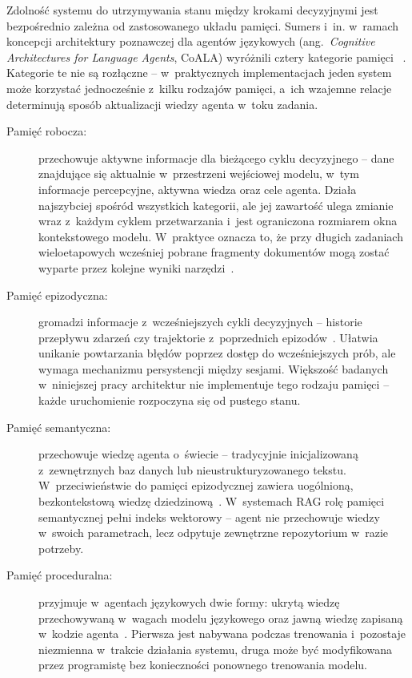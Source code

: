 Zdolność systemu do utrzymywania stanu między krokami decyzyjnymi jest
bezpośrednio zależna od zastosowanego układu pamięci. Sumers i~in. w~ramach
koncepcji architektury poznawczej dla agentów językowych
(ang.~\textit{Cognitive Architectures for Language Agents}, CoALA) wyróżnili
cztery kategorie pamięci ~\cite{sumers2023cognitive}. Kategorie te nie są
rozłączne -- w~praktycznych implementacjach jeden system może korzystać
jednocześnie z~kilku rodzajów pamięci, a~ich wzajemne relacje determinują
sposób aktualizacji wiedzy agenta w~toku zadania.

\begin{description}
  \item[Pamięć robocza:] przechowuje aktywne informacje dla bieżącego cyklu decyzyjnego
        -- dane znajdujące się aktualnie w~przestrzeni wejściowej modelu, w~tym
        informacje percepcyjne, aktywna wiedza oraz cele agenta. Działa najszybciej
        spośród wszystkich kategorii, ale jej zawartość ulega zmianie wraz z~każdym
        cyklem przetwarzania i~jest ograniczona rozmiarem okna kontekstowego modelu.
        W~praktyce oznacza to, że przy długich zadaniach wieloetapowych wcześniej
        pobrane fragmenty dokumentów mogą zostać wyparte przez kolejne wyniki
        narzędzi~\cite{sumers2023cognitive}.

  \item[Pamięć epizodyczna:] gromadzi informacje z~wcześniejszych cykli decyzyjnych --
        historie przepływu zdarzeń czy trajektorie z~poprzednich
        epizodów~\cite{sumers2023cognitive}. Ułatwia unikanie powtarzania błędów
        poprzez dostęp do wcześniejszych prób, ale wymaga mechanizmu persystencji
        między sesjami. Większość badanych w~niniejszej pracy architektur nie
        implementuje tego rodzaju pamięci -- każde uruchomienie rozpoczyna się od
        pustego stanu.

  \item[Pamięć semantyczna:] przechowuje wiedzę agenta o~świecie -- tradycyjnie
        inicjalizowaną z~zewnętrznych baz danych lub nieustrukturyzowanego tekstu.
        W~przeciwieństwie do pamięci epizodycznej zawiera uogólnioną, bezkontekstową
        wiedzę dziedzinową~\cite{sumers2023cognitive}. W~systemach RAG rolę pamięci
        semantycznej pełni indeks wektorowy -- agent nie przechowuje wiedzy w~swoich
        parametrach, lecz odpytuje zewnętrzne repozytorium w~razie potrzeby.

  \item[Pamięć proceduralna:] przyjmuje w~agentach językowych dwie formy: ukrytą wiedzę
        przechowywaną w~wagach modelu językowego oraz jawną wiedzę zapisaną w~kodzie
        agenta~\cite{sumers2023cognitive}. Pierwsza jest nabywana podczas trenowania
        i~pozostaje niezmienna w~trakcie działania systemu, druga może być modyfikowana
        przez programistę bez konieczności ponownego trenowania modelu.
\end{description}

